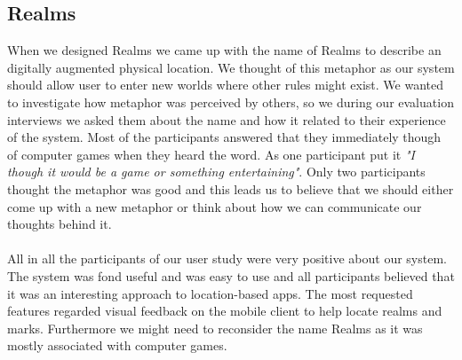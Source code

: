 \subsection{Realms} %
\label{sub:realms}
When we designed Realms we came up with the name of Realms to describe an digitally augmented physical location. We thought of this metaphor as our system should allow user to enter new worlds where other rules might exist. We wanted to investigate how metaphor was perceived by others, so we during our evaluation interviews we asked them about the name and how it related to their experience of the system.
Most of the participants answered that they immediately though of computer games when they heard the word. As one participant put it \emph{"I though it would be a game or something entertaining"}. Only two participants thought the metaphor was good and this leads us to believe that we should either come up with a new metaphor or think about how we can communicate our thoughts behind it. 
\\\\
All in all the participants of our user study were very positive about our system. The system was fond useful and was easy to use and all participants believed that it was an interesting approach to location-based apps. The most requested features regarded visual feedback on the mobile client to help locate realms and marks. Furthermore we might need to reconsider the name Realms as it was mostly associated with computer games. 

